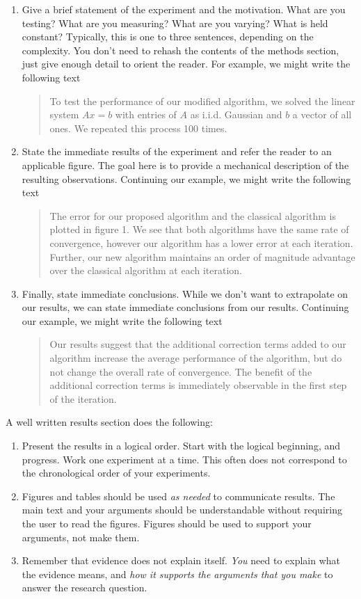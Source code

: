 \documentclass[]{article}
\begin{document}
\begin{enumerate}
    \item Give a brief statement of the experiment and the motivation. What are you testing? What are you measuring? What are you varying? What is held constant? Typically, this is one to three sentences, depending on the complexity. You don't need to rehash the contents of the methods section, just give enough detail to orient the reader. For example, we might write the following text
    \begin{quote}
        To test the performance of our modified algorithm, we solved the linear system $Ax=b$ with entries of $A$ as i.i.d. Gaussian and $b$ a vector of all ones. We repeated this process 100 times.
    \end{quote}
    \item State the immediate results of the experiment and refer the reader to an applicable figure. The goal here is to provide a mechanical description of the resulting observations.
    Continuing our example, we might write the following text
    \begin{quote}
        The error for our proposed algorithm and the classical algorithm is plotted in figure 1. We see that both algorithms have the same rate of convergence, however our algorithm has a lower error at each iteration. Further, our new algorithm maintains an order of magnitude advantage over the classical algorithm at each iteration.
    \end{quote}
    \item Finally, state immediate conclusions. While we don't want to extrapolate on our results, we can state immediate conclusions from our results. Continuing our example, we might write the following text
    \begin{quote}
        Our results suggest that the additional correction terms added to our algorithm increase the average performance of the algorithm, but do not change the overall rate of convergence. The benefit of the additional correction terms is immediately observable in the first step of the iteration.
    \end{quote}
\end{enumerate}

A well written results section does the following:
\begin{enumerate}
    \item Present the results in a logical order. Start with the logical beginning, and progress. Work one experiment at a time. This often does not correspond to the chronological order of your experiments.
    \item Figures and tables should be used \emph{as needed} to communicate results. The main text and your arguments should be understandable without requiring the user to read the figures. Figures should be used to support your arguments, not make them.
    \item Remember that evidence does not explain itself. \emph{You} need to explain what the evidence means, and \emph{how it supports the arguments that you make} to answer the research question.
\end{enumerate}
\end{document}
